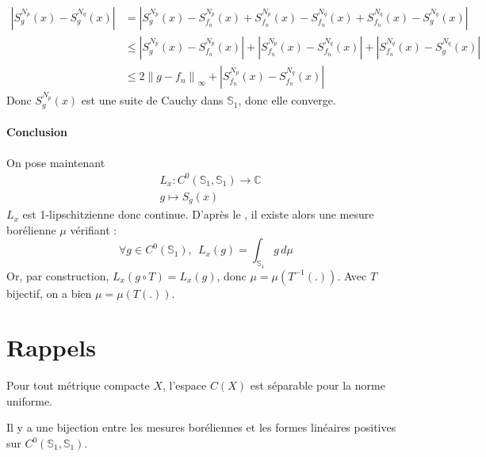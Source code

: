 \documentclass[11pt,a4paper]{article}
\begin{document}
\[
\begin{aligned}
|S^{N_p}_g (x) - S^{N_q}_g (x)| &= \left| S^{N_p}_g (x) - S^{N_p}_{f_n} (x) + S^{N_p}_{f_n} (x) - S^{N_q}_{f_n} (x) + S^{N_q}_{f_n} (x) - S^{N_q}_g (x) \right| \\
&\leq \left| S^{N_p}_g (x) - S^{N_p}_{f_n} (x) \right| + \left| S^{N_p}_{f_n} (x) - S^{N_q}_{f_n} (x) \right| + \left| S^{N_q}_{f_n} (x) - S^{N_q}_g (x) \right| \\
&\leq 2 \left\| g - f_n \right\|_\infty + \left| S^{N_p}_{f_n} (x) - S^{N_q}_{f_n} (x) \right|
\end{aligned}
\]
Donc $S^{N_p}_g (x)$ est une suite de Cauchy dans $\mathbb{S}_1$, donc elle converge.

\paragraph{Conclusion}
On pose maintenant 
\[
\begin{aligned}
&L_x: C^0(\mathbb{S}_1,\mathbb{S}_1) \to \mathbb{C} \\
&g \mapsto S_g(x)
\end{aligned}
\]
$L_x$ est 1-lipschitzienne donc continue. D'après le , il existe alors une mesure borélienne $\mu$ vérifiant :
\[
\forall g \in C^0(\mathbb{S}_1), \: \: L_x(g) = \int_{\mathbb{S}_1} g \, d\mu
\]
Or, par construction, $L_x(g \circ T) = L_x(g)$, donc $\mu = \mu(T^{-1}(.))$. Avec $T$ bijectif, on a bien $\mu = \mu(T(.))$.

\section*{Rappels}
\begin{mthm}{1}\label{foo}
Pour tout métrique compacte $X$, l'espace $C(X)$ est séparable pour la norme uniforme.
\end{mthm}

\begin{mthm}{2}\label{fooo}
Il y a une bijection entre les mesures boréliennes et les formes linéaires positives sur $C^0(\mathbb{S}_1,\mathbb{S}_1)$.
\end{mthm}


\newpage
\printbibliography[heading=bibintoc, title={Références}]
\end{document}
